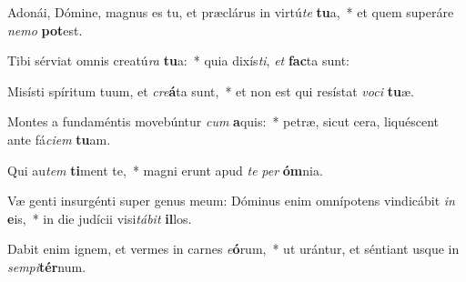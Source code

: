\item Adonái, Dómine, magnus es tu, et præclárus in virtú\textit{te} \textbf{tu}a,~* et quem superáre \textit{ne}\textit{mo} \textbf{pot}est.
\item Tibi sérviat omnis creatú\textit{ra} \textbf{tu}a:~* quia dixís\textit{ti}, \textit{et} \textbf{fac}ta sunt:
\item Misísti spíritum tuum, et \textit{cre}\textbf{á}ta sunt,~* et non est qui resístat \textit{vo}\textit{ci} \textbf{tu}æ.
\item Montes a fundaméntis movebúntur \textit{cum} \textbf{a}quis:~* petræ, sicut cera, liquéscent ante fá\textit{ci}\textit{em} \textbf{tu}am.
\item Qui au\textit{tem} \textbf{ti}ment te,~* magni erunt apud \textit{te} \textit{per} \textbf{óm}nia.
\item Væ genti insurgénti super genus meum: Dóminus enim omnípotens vindicábit \textit{in} \textbf{e}is,~* in die judícii visi\textit{tá}\textit{bit} \textbf{il}los.
\item Dabit enim ignem, et vermes in carnes \textit{e}\textbf{ó}rum,~* ut urántur, et séntiant usque in \textit{sem}\textit{pi}\textbf{tér}num.
